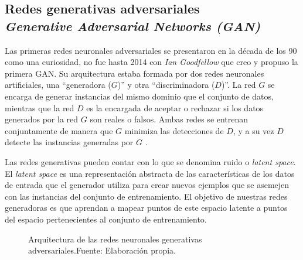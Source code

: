 \subsection[\texorpdfstring{Redes generativas adversariales \\ \textit{Generative Adversarial Networks (GAN)}}{Redes generativas adversariales - Generative Adversarial Networks (GAN)}]%
{Redes generativas adversariales \\ \textit{Generative Adversarial Networks (GAN)}}

Las primeras redes neuronales adversariales se presentaron en la década de los 90 como una curiosidad, no fue hasta 2014 con \textit{Ian Goodfellow} que creo y propuso la primera \gls{GAN}. Su arquitectura estaba formada por dos redes neuronales artificiales, una ``generadora (${G}$)'' y otra ``discriminadora (${D}$)''. La red ${G}$ se encarga de generar instancias del mismo dominio que el conjunto de datos, mientras que la red ${D}$ es la encargada de aceptar o rechazar si los datos generados por la red ${G}$ son reales o falsos. Ambas redes se entrenan conjuntamente de manera que ${G}$ minimiza las detecciones de ${D}$, y a su vez ${D}$ detecte las instancias generadas por ${G}$ \cite{de2023redes}.

Las redes generativas pueden contar con lo que se denomina ruido o \textit{latent space}. El \textit{latent space} es una representación abstracta de las características de los datos de entrada que el generador utiliza para crear nuevos ejemplos que se asemejen con las instancias del conjunto de entrenamiento. El objetivo de nuestras redes generadoras es que aprendan a mapear puntos de este espacio latente a puntos del espacio pertenecientes al conjunto de entrenamiento.

\begin{figure}[H]
    \centering
    \centerline{}
    \caption{Arquitectura de las redes neuronales generativas adversariales.\newline{}Fuente: Elaboración propia.}
    \label{fig:gans-architecture}
\end{figure}

